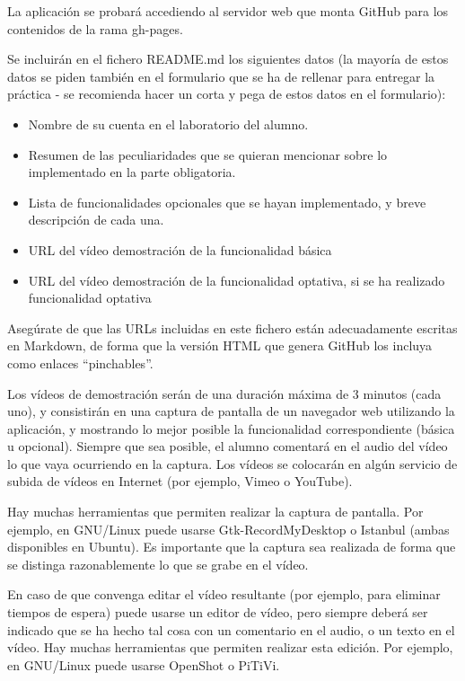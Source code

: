 La aplicación se probará accediendo al servidor web que monta GitHub para los contenidos de la rama gh-pages.

Se incluirán en el fichero README.md los siguientes datos (la mayoría de estos datos se piden también en el formulario que se ha de rellenar para entregar la práctica - se recomienda hacer un corta y pega de estos datos en el formulario):

\begin{itemize}
\item Nombre de su cuenta en el laboratorio del alumno.
\item Resumen de las peculiaridades que se quieran mencionar sobre lo implementado en la parte obligatoria.
\item Lista de funcionalidades opcionales que se hayan implementado, y breve descripción de cada una.
\item URL del vídeo demostración de la funcionalidad básica
\item URL del vídeo demostración de la funcionalidad optativa, si se ha realizado funcionalidad optativa
\end{itemize}

Asegúrate de que las URLs incluidas en este fichero están adecuadamente escritas en Markdown, de forma que la versión HTML que genera GitHub los incluya como enlaces ``pinchables''.

Los vídeos de demostración serán de una duración máxima de 3 minutos (cada uno), y consistirán en una captura de pantalla de un navegador web utilizando la aplicación, y mostrando lo mejor posible la funcionalidad correspondiente (básica u opcional). Siempre que sea posible, el alumno comentará en el audio del vídeo lo que vaya ocurriendo en la captura. Los vídeos se colocarán en algún servicio de subida de vídeos en Internet (por ejemplo, Vimeo o YouTube).

Hay muchas herramientas que permiten realizar la captura de pantalla. Por ejemplo, en GNU/Linux puede usarse Gtk-RecordMyDesktop o Istanbul (ambas disponibles en Ubuntu). Es importante que la captura sea realizada de forma que se distinga razonablemente lo que se grabe en el vídeo.

En caso de que convenga editar el vídeo resultante (por ejemplo, para eliminar tiempos de espera) puede usarse un editor de vídeo, pero siempre deberá ser indicado que se ha hecho tal cosa con un comentario en el audio, o un texto en el vídeo. Hay muchas herramientas que permiten realizar esta edición. Por ejemplo, en GNU/Linux puede usarse OpenShot o PiTiVi.


